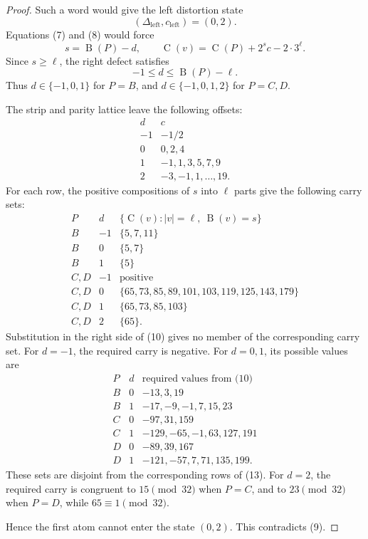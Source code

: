 \documentclass[11pt]{article}
\newcommand{\mass}{\operatorname{B}}
\newcommand{\car}{\operatorname{C}}
\begin{document}
\begin{proof}
Such a word would give the left distortion state
\[
 (\Delta_{\mathrm{left}},c_{\mathrm{left}})=(0,2).
 \tag{9}
\]
Equations (7) and (8) would force
\[
 s=\mass(P)-d,
 \qquad
 \car(v)=\car(P)+2^s c-2\cdot3^\ell.
 \tag{10}
\]
Since \(s\geq\ell\), the right defect satisfies
\[
 -1\leq d\leq\mass(P)-\ell.
 \tag{11}
\]
Thus \(d\in\{-1,0,1\}\) for \(P=B\), and
\(d\in\{-1,0,1,2\}\) for \(P=C,D\).

The strip and parity lattice leave the following offsets:
\[
\begin{array}{c|c}
 d&c\\ \hline
 -1&-1/2\\
 0&0,2,4\\
 1&-1,1,3,5,7,9\\
 2&-3,-1,1,\ldots,19.
\end{array}
\tag{12}
\]
For each row, the positive compositions of \(s\) into \(\ell\) parts
give the following carry sets:
\[
\begin{array}{c|c|l}
P&d&\{\car(v):|v|=\ell,\ \mass(v)=s\}\\ \hline
B&-1&\{5,7,11\}\\
B&0&\{5,7\}\\
B&1&\{5\}\\ \hline
C,D&-1&\text{positive}\\
C,D&0&\{65,73,85,89,101,103,119,125,143,179\}\\
C,D&1&\{65,73,85,103\}\\
C,D&2&\{65\}.
\end{array}
\tag{13}
\]
Substitution in the right side of (10) gives no member of the
corresponding carry set.  For \(d=-1\), the required carry is negative.
For \(d=0,1\), its possible values are
\[
\begin{array}{c|c|l}
P&d&\text{required values from (10)}\\ \hline
B&0&-13,3,19\\
B&1&-17,-9,-1,7,15,23\\
C&0&-97,31,159\\
C&1&-129,-65,-1,63,127,191\\
D&0&-89,39,167\\
D&1&-121,-57,7,71,135,199.
\end{array}
\]
These sets are disjoint from the corresponding rows of (13).  For
\(d=2\), the required carry is congruent to \(15\pmod {32}\) when
\(P=C\), and to \(23\pmod {32}\) when \(P=D\), while
\(65\equiv1\pmod {32}\).

Hence the first atom cannot enter the state \((0,2)\).  This contradicts
(9).
\end{proof}
\end{document}

